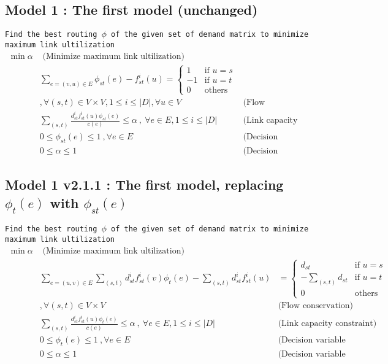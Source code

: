 \documentclass{ctexart}
\begin{document}
\subsection{Model 1 : The first model (unchanged)}
\texttt{Find the best routing $\phi$ of the given set of demand matrix to minimize maximum link ultilization} 
\begin{equation}
	\begin{aligned}
		\min \alpha & \text{  (Minimize maximum link ultilization)}\\
		& \sum_{e=(v,u)\in E}\phi_{st}(e)-f_{st}^i(u)=\begin{cases}
			1 &\text{if } u=s \\
			-1 &\text{if } u=t \\
			0 &\text{others} 
		 \end{cases}\\
		& ,\forall (s,t)\in V\times V,1\leq i\leq|\textit{D}| , \forall u\in V & \text{(Flow conservation)}\\
		& \sum_{(s,t)}\frac{
			d_{st}^if_{st}^i(u)\phi_{st}(e)}{c(e)} \leq \alpha\ ,\ \forall e\in E,1\leq i\leq|\textit{D}| &  \text{(Link capacity constraint)} \\
		& 0\leq\phi_{st}(e)\leq1\ ,\forall e\in E\ & \text{(Decision variable constraint)}\\
		& 0\leq\alpha\leq1\ & \text{(Decision variable constraint)}
	\end{aligned}
\end{equation}

\subsection{Model 1 v2.1.1 : The first model, replacing $\phi_t(e)$ with $\phi_{st}(e)$}
\texttt{Find the best routing $\phi$ of the given set of demand matrix to minimize maximum link ultilization} 
\begin{equation}
	\begin{aligned}
		\min \alpha & \text{  (Minimize maximum link ultilization)}\\
		& \sum_{e=(u,v)\in E}\sum_{(s,t)}d_{st}^if_{st}^i(v)\phi_{t}(e)-\sum_{(s,t)}d_{st}^if_{st}^i(u) & =\begin{cases}
			d_{st} &\text{if } u=s \\
			-\sum_{(s,t)}d_{st} &\text{if } u=t \\
			0 &\text{others} 
		 \end{cases}\\
		&, \forall (s,t)\in V\times V & \text{(Flow conservation)}\\
		& \sum_{(s,t)}\frac{
			d_{st}^if_{st}^i(u)\phi_{t}(e)}{c(e)} \leq \alpha\ ,\ \forall e\in E,1\leq i\leq|\textit{D}| &  \text{(Link capacity constraint)} \\
		& 0\leq\phi_{t}(e)\leq1\ ,\forall e\in E\ & \text{(Decision variable constraint)}\\
		& 0\leq\alpha\leq1\ & \text{(Decision variable constraint)} \\
	\end{aligned}
\end{equation}
\end{document}
